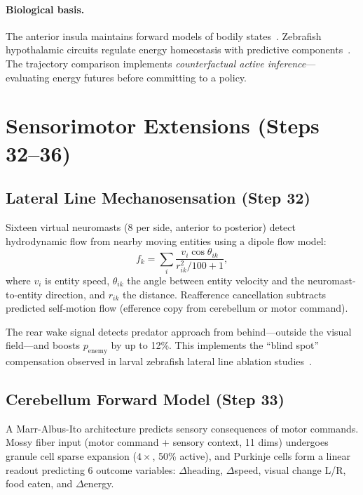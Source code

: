 \documentclass[11pt,a4paper]{article}
\begin{document}
\paragraph{Biological basis.}
The anterior insula maintains forward models of bodily
states~\cite{craig2009,seth2016}.  Zebrafish hypothalamic circuits
regulate energy homeostasis with predictive
components~\cite{yokogawa2012}.  The trajectory comparison implements
\emph{counterfactual active inference}---evaluating energy futures
before committing to a policy.

\section{Sensorimotor Extensions (Steps 32--36)}\label{sec:extensions}

\subsection{Lateral Line Mechanosensation (Step 32)}

Sixteen virtual neuromasts (8 per side, anterior to posterior) detect
hydrodynamic flow from nearby moving entities using a dipole flow model:
\begin{equation}
  f_k = \sum_i \frac{v_i \cos\theta_{ik}}{r_{ik}^2 / 100 + 1},
\end{equation}
where $v_i$ is entity speed, $\theta_{ik}$ the angle between entity
velocity and the neuromast-to-entity direction, and $r_{ik}$ the distance.
Reafference cancellation subtracts predicted self-motion flow
(efference copy from cerebellum or motor command).

The rear wake signal detects predator approach from behind---outside
the visual field---and boosts $p_\text{enemy}$ by up to 12\%.
This implements the ``blind spot'' compensation observed in larval
zebrafish lateral line ablation studies~\cite{stewart2013}.

\subsection{Cerebellum Forward Model (Step 33)}

A Marr-Albus-Ito architecture predicts sensory consequences of motor
commands.  Mossy fiber input (motor command + sensory context, 11 dims)
undergoes granule cell sparse expansion ($4\times$, 50\% active), and
Purkinje cells form a linear readout predicting 6 outcome variables:
$\Delta$heading, $\Delta$speed, visual change L/R, food eaten, and
$\Delta$energy.
\end{document}
